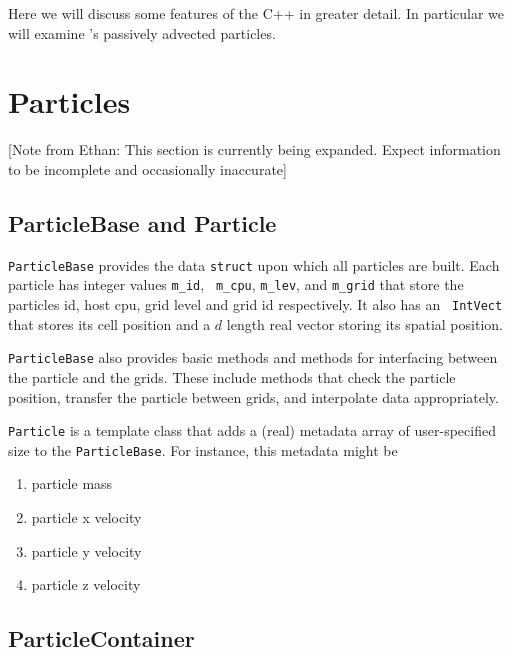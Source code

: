 Here we will discuss some features of the C++ in greater detail. In 
particular we will examine \BoxLib's passively advected particles.

\section{Particles}\label{Sec:Particles}
[Note from Ethan: This section is currently being expanded. Expect information to be 
incomplete and occasionally inaccurate]

\subsection{ParticleBase and Particle}
{\tt ParticleBase} provides the data {\tt struct} upon which all 
particles are built. Each particle has integer values {\tt m\_id}, {\tt 
m\_cpu}, {\tt m\_lev}, and {\tt m\_grid} that store the particles id, 
host cpu, grid level and grid id respectively. It also has an {\tt 
IntVect} that stores its cell position and a $d$ length real vector 
storing its spatial position.

{\tt ParticleBase} also provides basic methods and methods for interfacing between 
the particle and the grids. These include methods that check the 
particle position, transfer the particle between grids, and 
interpolate data appropriately.

{\tt Particle} is a template class that adds a (real) metadata array of 
user-specified size to the {\tt ParticleBase}. For instance, this 
metadata might be 
\begin{enumerate}
   \item particle mass
   \item particle x velocity
   \item particle y velocity
   \item particle z velocity
\end{enumerate}
\subsection{ParticleContainer}
